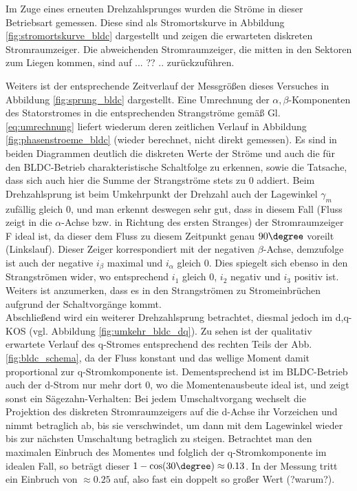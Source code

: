 \noindent Im Zuge eines erneuten Drehzahlsprunges wurden die Ströme in dieser Betriebsart gemessen. Diese sind als Stromortskurve in Abbildung \ref{fig:stromortskurve_bldc} dargestellt und zeigen die erwarteten diskreten Stromraumzeiger. Die abweichenden Stromraumzeiger, die mitten in den Sektoren zum Liegen kommen, sind auf ... ?? .. zurückzuführen.



\noindent Weiters ist der entsprechende Zeitverlauf der Messgrößen dieses Versuches in Abbildung \ref{fig:sprung_bldc} dargestellt. Eine Umrechnung der $\alpha, \beta$-Komponenten des Statorstromes in die entsprechenden Strangströme gemäß Gl. \ref{eq:umrechnung} liefert wiederum deren zeitlichen Verlauf in Abbildung \ref{fig:phasenstroeme_bldc} (wieder berechnet, nicht direkt gemessen). Es sind in beiden Diagrammen deutlich die diskreten Werte der Ströme und auch die für den BLDC-Betrieb charakteristische Schaltfolge zu erkennen, sowie die Tatsache, dass sich auch hier die Summe der Strangströme stets zu 0 addiert. Beim Drehzahlsprung ist beim Umkehrpunkt der Drehzahl auch der Lagewinkel $\gamma_m$ zufällig gleich 0, und man erkennt deswegen sehr gut, dass in diesem Fall (Fluss zeigt in die $\alpha$-Achse bzw. in Richtung des ersten Stranges) der Stromraumzeiger F ideal ist, da dieser dem Fluss zu diesem Zeitpunkt genau $90\degree$ voreilt (Linkslauf). Dieser Zeiger korrespondiert mit der negativen $\beta$-Achse, demzufolge ist auch der negative $i_{\beta}$ maximal und $i_{\alpha}$ gleich 0. Dies spiegelt sich ebenso in den Strangströmen wider, wo entsprechend $i_1$ gleich 0, $i_2$ negativ und $i_3$ positiv ist. Weiters ist anzumerken, dass es in den Strangströmen zu Stromeinbrüchen aufgrund der Schaltvorgänge kommt.\\
\noindent Abschließend wird ein weiterer Drehzahlsprung betrachtet, diesmal jedoch im d,q-KOS (vgl. Abbildung \ref{fig:umkehr_bldc_dq}). Zu sehen ist der qualitativ erwartete Verlauf des q-Stromes entsprechend des rechten Teils der Abb. \ref{fig:bldc_schema}, da der Fluss konstant und das wellige Moment damit proportional zur q-Stromkomponente ist. Dementsprechend ist im BLDC-Betrieb auch der d-Strom nur mehr dort 0, wo die Momentenausbeute ideal ist, und zeigt sonst ein Sägezahn-Verhalten: Bei jedem Umschaltvorgang wechselt die Projektion des diskreten Stromraumzeigers auf die d-Achse ihr Vorzeichen und nimmt betraglich ab, bis sie verschwindet, um dann mit dem Lagewinkel wieder bis zur nächsten Umschaltung betraglich zu steigen. Betrachtet man den maximalen Einbruch des Momentes und folglich der q-Stromkomponente im idealen Fall, so beträgt dieser $1-\cos(30\degree) \approx 0.13$. In der Messung tritt ein Einbruch von $\approx 0.25$ auf, also fast ein doppelt so großer Wert (?warum?).





